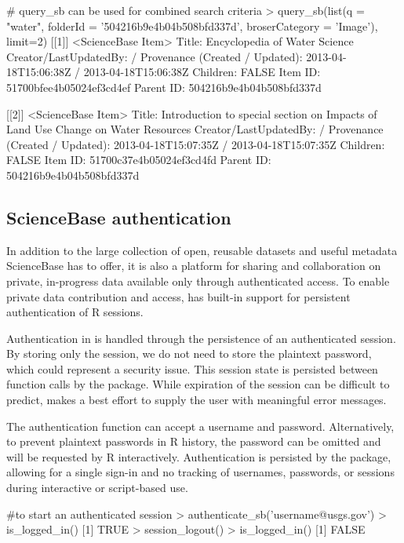 \begin{example}

# query_sb can be used for combined search criteria
> query_sb(list(q = "water", folderId = '504216b9e4b04b508bfd337d', broserCategory = 'Image'), limit=2)
[[1]]
<ScienceBase Item> 
  Title: Encyclopedia of Water Science
  Creator/LastUpdatedBy:      / 
  Provenance (Created / Updated):  2013-04-18T15:06:38Z / 2013-04-18T15:06:38Z
  Children: FALSE
  Item ID: 51700bfee4b05024ef3cd4ef
  Parent ID: 504216b9e4b04b508bfd337d

[[2]]
<ScienceBase Item> 
  Title: Introduction to special section on Impacts of Land Use Change on Water Resources
  Creator/LastUpdatedBy:      / 
  Provenance (Created / Updated):  2013-04-18T15:07:35Z / 2013-04-18T15:07:35Z
  Children: FALSE
  Item ID: 51700c37e4b05024ef3cd4fd
  Parent ID: 504216b9e4b04b508bfd337d

\end{example}


\subsection{ScienceBase authentication}
In addition to the large collection of open, reusable datasets and 
useful metadata ScienceBase has to offer, it is
also a platform for sharing and collaboration on private, in-progress 
data available only through authenticated access. To enable 
private data contribution and access, 
 has built-in support for persistent 
authentication of R sessions. 

Authentication in  is handled through the persistence of 
an authenticated session. By storing only the session, we do not need to 
store the plaintext password, which could represent a security issue. This
session state is persisted between function calls by the package. While  
expiration of the session can be difficult to predict, 
makes a best effort to supply the user with meaningful error messages.

The authentication function  can accept a username
and password. Alternatively, to prevent plaintext passwords in R history, 
the password can be omitted and will be requested by R interactively. 
Authentication is persisted by the package, allowing for a single sign-in
and no tracking of usernames, passwords, or sessions during interactive or
script-based use. 

\begin{example}
#to start an authenticated session
> authenticate_sb('username@usgs.gov')
> is_logged_in()
[1] TRUE
> session_logout()
> is_logged_in()
[1] FALSE
\end{example}

